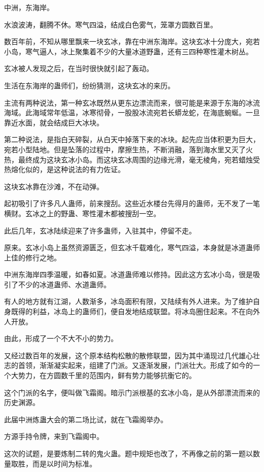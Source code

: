 
\begin{this_body}

中洲，东海岸。

水浪波涛，翻腾不休。寒气四溢，结成白色雾气，笼罩方圆数百里。

数百年前，不知从哪里飘来一块玄冰，靠在中洲东海岸。这块玄冰十分庞大，宛若小岛，寒气逼人，冰上聚集着不少的大量冰道野蛊，还有三四种寒性灌木树丛。

玄冰被人发现之后，在当时很快就引起了轰动。

生活在东海岸的蛊师们，纷纷猜测，这块玄冰的来历。

主流有两种说法，第一种玄冰既然从更东边漂流而来，很可能是来源于东海的冰流海域。此海域常年低温，冰寒彻骨，一股股冰流宛若长蟒龙蛇，在海底蜿蜒。一旦靠近水面，就会结成巨大冰块。

第二种说法，是指白天碎裂，从白天中掉落下来的冰块。起先应当体积更为巨大，宛若小型陆地。但是坠落的过程中，摩擦生热，不断消融，落到海水里又灭了火热，最终成为这块玄冰小岛。而这块玄冰周围的边缘光滑，毫无棱角，宛若蜡烛受热熔化似的，是这种说法的有力佐证。

这块玄冰靠在沙滩，不在动弹。

起初吸引了许多凡人蛊师，前来搜刮。这些近水楼台先得月的蛊师，无不发了一笔横财。玄冰之上的野蛊、寒性灌木都被搜刮一空。

此后几年，玄冰陆续迎来了许多蛊师，入驻其中，停留不走。

原来。玄冰小岛上虽然资源匮乏，但玄冰千载难化，寒气四溢，本身就是冰道蛊师上佳的修行之地。

中洲东海岸四季温暖，如春如夏。冰道蛊师难以修持。因此这方玄冰小岛，很是吸引了不少的冰道蛊师、水道蛊师。

有人的地方就有江湖，人数渐多，冰岛面积有限，又陆续有外人进来。为了维护自身既得的利益，冰岛上的蛊师们，便自发地结成联盟。将冰岛圈住起来。不在向外人开放。

由此，形成了一个不大不小的势力。

又经过数百年的发展，这个原本结构松散的散修联盟，因为其中涌现过几代雄心壮志的首领，渐渐凝实起来，组建了门派。又逐渐发展，门派壮大。形成了如今的一个大势力，在方圆数千里的范围内，鲜有势力能够抗衡它的。

这个门派的名字，便叫做飞霜阁。暗示门派根基的玄冰小岛，是从外部漂流而来的历史渊源。

此届中洲炼蛊大会的第二场比试，就在飞霜阁举办。

方源手持令牌，来到飞霜阁中。

这次的试题，是要炼制二转的鬼火蛊。题中规矩也改了，不再像之前的第一题以数量取胜，而是以时间为标准。


\end{this_body}
